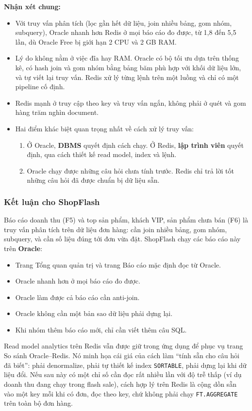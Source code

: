 \textbf{Nhận xét chung:}
\begin{itemize}
  \item Với truy vấn phân tích (lọc gần hết dữ liệu, join nhiều bảng, gom nhóm, subquery), Oracle nhanh hơn Redis ở mọi báo cáo đo được, từ 1,8 đến 5,5 lần, dù Oracle Free bị giới hạn 2 CPU và 2 GB RAM.
  \item Lý do không nằm ở việc đĩa hay RAM. Oracle có bộ tối ưu dựa trên thống kê, có hash join và gom nhóm bằng bảng băm phù hợp với khối dữ liệu lớn, và tự viết lại truy vấn. Redis xử lý từng lệnh trên một luồng và chỉ có một pipeline cố định.
  \item Redis mạnh ở truy cập theo key và truy vấn ngắn, không phải ở quét và gom hàng trăm nghìn document.
  \item Hai điểm khác biệt quan trọng nhất về cách xử lý truy vấn:
  \begin{enumerate}
    \item Ở Oracle, \textbf{DBMS} quyết định cách chạy. Ở Redis, \textbf{lập trình viên} quyết định, qua cách thiết kế read model, index và lệnh.
    \item Oracle chạy được những câu hỏi chưa tính trước. Redis chỉ trả lời tốt những câu hỏi đã được chuẩn bị dữ liệu sẵn.
  \end{enumerate}
\end{itemize}

\subsubsection{Kết luận cho ShopFlash}\label{sec:q-conclusion}

Báo cáo doanh thu (F5) và top sản phẩm, khách VIP, sản phẩm chưa bán (F6) là truy vấn phân tích trên dữ liệu đơn hàng: cần join nhiều bảng, gom nhóm, subquery, và cần số liệu đúng tới đơn vừa đặt. ShopFlash chạy các báo cáo này trên \textbf{Oracle}:
\begin{itemize}
  \item Trang Tổng quan quản trị và trang Báo cáo mặc định đọc từ Oracle.
  \item Oracle nhanh hơn ở mọi báo cáo đo được.
  \item Oracle làm được cả báo cáo cần anti-join.
  \item Oracle không cần một bản sao dữ liệu phải dựng lại.
  \item Khi nhóm thêm báo cáo mới, chỉ cần viết thêm câu SQL.
\end{itemize}

Read model analytics trên Redis vẫn được giữ trong ứng dụng để phục vụ trang So sánh Oracle--Redis. Nó minh họa cái giá của cách làm ``tính sẵn cho câu hỏi đã biết'': phải denormalize, phải tự thiết kế index \texttt{SORTABLE}, phải dựng lại khi dữ liệu đổi. Nếu sau này có một chỉ số cần đọc rất nhiều lần với độ trễ thấp (ví dụ doanh thu đang chạy trong flash sale), cách hợp lý trên Redis là cộng dồn sẵn vào một key mỗi khi có đơn, đọc theo key, chứ không phải chạy \texttt{FT.AGGREGATE} trên toàn bộ đơn hàng.
